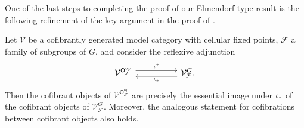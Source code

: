 \documentclass[a4paper,10pt]{article}%
\begin{document}
\begin{remark}
\end{remark}













One of the last steps to completing the proof of our Elmendorf-type result is the following refinement of the key argument in the proof of
\cite[Thm. 2.10]{Ste16}.


\begin{proposition}\label{COFESSIM PROP}
	Let $\mathcal{V}$ be a cofibrantly generated model category with cellular fixed points, $\mathcal{F}$ a family of subgroups of $G$,
	and consider the reflexive adjunction
\begin{equation}\label{COFADJ EQ}
\begin{tikzcd}[column sep =5em]
	\mathcal{V}^{\mathsf{O}_{\mathcal{F}}^{op}}
	\ar[shift left=1.5]{r}{\iota^{\**}} 
&
	\mathcal{V}^G_{\mathcal{F}}
	\ar[shift left=1.5]{l}{\iota_{\**}}.
\end{tikzcd}
\end{equation}
Then the cofibrant objects of 
$\mathcal{V}^{\mathsf{O}_{\mathcal{F}}^{op}}$
are precisely the essential image under $\iota_{\**}$
of the cofibrant objects of
$\mathcal{V}^G_{\mathcal{F}}$.
Moreover, the analogous statement for cofibrations between cofibrant objects also holds.
\end{proposition}
\end{document}
